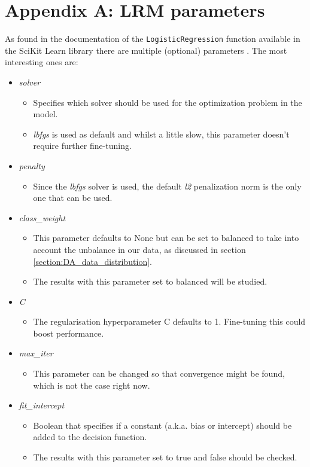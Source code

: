 \chapter*{Appendix A: LRM parameters}

As found in the documentation of the \texttt{LogisticRegression} function available in the SciKit Learn library there are multiple (optional) parameters \citep{scikit_learn}.
The most interesting ones are:

\begin{itemize}
    \item \emph{solver}
    \begin{itemize}
        \item Specifies which solver should be used for the optimization problem in the model.
        \item \emph{lbfgs} is used as default and whilst a little slow, this parameter doesn't require further fine-tuning.
    \end{itemize}
    \item \emph{penalty}
    \begin{itemize}
        \item Since the \emph{lbfgs} solver is used, the default \emph{l2} penalization norm is the only one that can be used.
    \end{itemize}
    \item \emph{class\_weight}
    \begin{itemize}
        \item This parameter defaults to None but can be set to balanced to take into account the unbalance in our data, as discussed in section \ref{section:DA_data_distribution}.
        \item The results with this parameter set to balanced will be studied.
    \end{itemize}
    \item \emph{C}
    \begin{itemize}
        \item The regularisation hyperparameter C defaults to 1. Fine-tuning this could boost performance.
    \end{itemize}
    \item \emph{max\_iter}
    \begin{itemize}
        \item This parameter can be changed so that convergence might be found, which is not the case right now.
    \end{itemize}
    \item \emph{fit\_intercept}
    \begin{itemize}
        \item Boolean that specifies if a constant (a.k.a. bias or intercept) should be added to the decision function.
        \item The results with this parameter set to true and false should be checked.
    \end{itemize}
\end{itemize}

